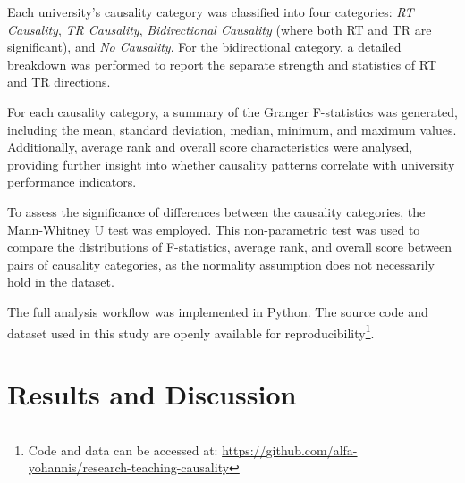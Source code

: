 \documentclass[a4paper, conference]{IEEEtran}
\begin{document}
Each university's causality category was classified into four categories: \textit{RT Causality}, \textit{TR Causality}, \textit{Bidirectional Causality} (where both RT and TR are significant), and \textit{No Causality}. For the bidirectional category, a detailed breakdown was performed to report the separate strength and statistics of RT and TR directions.

For each causality category, a summary of the Granger F-statistics was generated, including the mean, standard deviation, median, minimum, and maximum values. Additionally, average rank and overall score characteristics were analysed, providing further insight into whether causality patterns correlate with university performance indicators.

To assess the significance of differences between the causality categories, the Mann-Whitney U test \cite{mann1947test} was employed. This non-parametric test was used to compare the distributions of F-statistics, average rank, and overall score between pairs of causality categories, as the normality assumption does not necessarily hold in the dataset. 

The full analysis workflow was implemented in Python. The source code and dataset used in this study are openly available for reproducibility\footnote{Code and data can be accessed at:
	\url{https://github.com/alfa-yohannis/research-teaching-causality}
}.



\section{Results and Discussion}
\label{sec:results_and_discussion}
\end{document}
